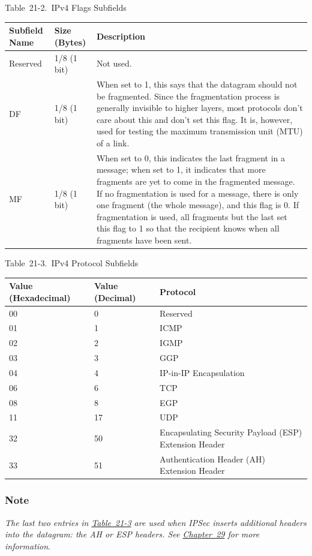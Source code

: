 \documentclass[b5paper,11pt]{memoir}
\begin{document}
\protect\hypertarget{ch21s02.htmlux5cux23ipv_flags_subfields}{}{}

Table~21-2.~IPv4 Flags Subfields

\begin{longtable}[]{@{}lll@{}}
\toprule
Subfield Name & Size (Bytes) & Description\tabularnewline
\midrule
\endhead
Reserved & 1/8 (1 bit) & Not used.\tabularnewline
DF & 1/8 (1 bit) & When set to 1, this says that the datagram should not
be fragmented. Since the fragmentation process is generally invisible to
higher layers, most protocols don't care about this and don't set this
flag. It is, however, used for testing the maximum transmission unit
(MTU) of a link.\tabularnewline
MF & 1/8 (1 bit) & When set to 0, this indicates the last fragment in a
message; when set to 1, it indicates that more fragments are yet to come
in the fragmented message. If no fragmentation is used for a message,
there is only one fragment (the whole message), and this flag is 0. If
fragmentation is used, all fragments but the last set this flag to 1 so
that the recipient knows when all fragments have been
sent.\tabularnewline
\bottomrule
\end{longtable}

\protect\hypertarget{ch21s02.htmlux5cux23ipv_protocol_subfields}{}{}

Table~21-3.~IPv4 Protocol Subfields

\begin{longtable}[]{@{}lll@{}}
\toprule
Value (Hexadecimal) & Value (Decimal) & Protocol\tabularnewline
\midrule
\endhead
00 & 0 & Reserved\tabularnewline
01 & 1 & ICMP\tabularnewline
02 & 2 & IGMP\tabularnewline
03 & 3 & GGP\tabularnewline
04 & 4 & IP-in-IP Encapsulation\tabularnewline
06 & 6 & TCP\tabularnewline
08 & 8 & EGP\tabularnewline
11 & 17 & UDP\tabularnewline
32 & 50 & Encapsulating Security Payload (ESP) Extension
Header\tabularnewline
33 & 51 & Authentication Header (AH) Extension Header\tabularnewline
\bottomrule
\end{longtable}

\subsubsection[Note]{\texorpdfstring{\protect\hypertarget{ch21s02.htmlux5cux23note-81}{}{}Note}{Note}}

{\emph{The last two entries in
\protect\hyperlink{ch21s02.htmlux5cux23ipv_protocol_subfields}{Table~21-3}
are used when IPSec inserts additional headers into the datagram: the AH
or ESP headers. See \protect\hyperlink{ch29.html}{Chapter~29} for more
information}}\protect\hypertarget{ch21s02.htmlux5cux23idx-CHP-21-0778}{}{}.
\end{document}
